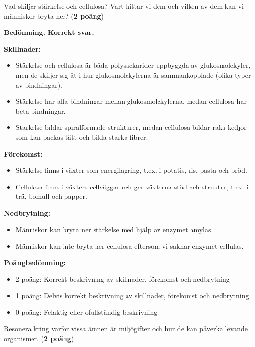 \documentclass[12pt]{exam}
\newenvironment{answer}
  {\begin{framed}\color{blue}\textbf{Bedömning:} }
  {\end{framed}}
\begin{document}
\begin{questions}
\question Vad skiljer stärkelse och cellulosa? Vart hittar vi dem och vilken av dem kan vi människor bryta ner? (\textbf{2 poäng})
\vspace{5mm}

\begin{answer}
\textbf{Korrekt svar:}

\textbf{Skillnader:}
\begin{itemize}
  \item Stärkelse och cellulosa är båda polysackarider uppbyggda av glukosmolekyler, men de skiljer sig åt i hur glukosmolekylerna är sammankopplade (olika typer av bindningar).
  \item Stärkelse har alfa-bindningar mellan glukosmolekylerna, medan cellulosa har beta-bindningar.
  \item Stärkelse bildar spiralformade strukturer, medan cellulosa bildar raka kedjor som kan packas tätt och bilda starka fibrer.
\end{itemize}

\textbf{Förekomst:}
\begin{itemize}
  \item Stärkelse finns i växter som energilagring, t.ex. i potatis, ris, pasta och bröd.
  \item Cellulosa finns i växters cellväggar och ger växterna stöd och struktur, t.ex. i trä, bomull och papper.
\end{itemize}

\textbf{Nedbrytning:}
\begin{itemize}
  \item Människor kan bryta ner stärkelse med hjälp av enzymet amylas.
  \item Människor kan inte bryta ner cellulosa eftersom vi saknar enzymet cellulas.
\end{itemize}

\textbf{Poängbedömning:}
\begin{itemize}
  \item 2 poäng: Korrekt beskrivning av skillnader, förekomst och nedbrytning
  \item 1 poäng: Delvis korrekt beskrivning av skillnader, förekomst och nedbrytning
  \item 0 poäng: Felaktig eller ofullständig beskrivning
\end{itemize}
\end{answer}
\vspace{5mm}

\question Resonera kring varför vissa ämnen är miljögifter och hur de kan påverka levande organismer. (\textbf{2 poäng})
\vspace{5mm}


\end{questions}
\end{document}
